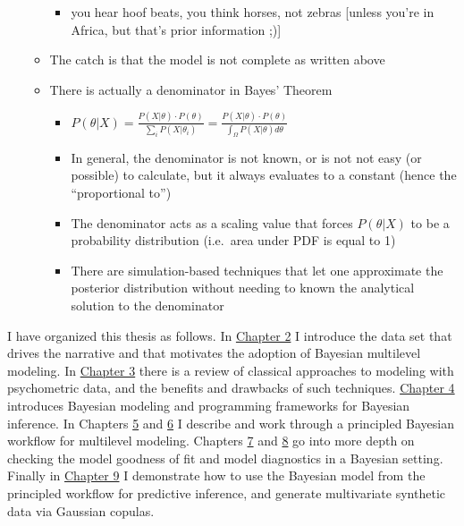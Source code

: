\documentclass[
]{article}
\providecommand{\tightlist}{%
  \setlength{\itemsep}{0pt}\setlength{\parskip}{0pt}}
\begin{document}
\begin{itemize}
\begin{itemize}
    \begin{itemize}
    \tightlist
    \item
      you hear hoof beats, you think horses, not zebras {[}unless you're in Africa, but that's prior information ;){]}
    \end{itemize}
  \item
    The catch is that the model is not complete as written above
  \item
    There is actually a denominator in Bayes' Theorem

    \begin{itemize}
    \tightlist
    \item
      \(P(\theta | X) = \frac{P(X | \theta)\cdot P(\theta)}{\sum_i P(X | \theta_i)} = \frac{P(X | \theta)\cdot P(\theta)}{\int_\Omega P(X | \theta)d\theta}\)
    \item
      In general, the denominator is not known, or is not not easy (or possible) to calculate, but it always evaluates to a constant (hence the ``proportional to'')
    \item
      The denominator acts as a scaling value that forces \(P(\theta|X)\) to be a probability distribution (i.e.~area under PDF is equal to 1)
    \item
      There are simulation-based techniques that let one approximate the posterior distribution without needing to known the analytical solution to the denominator
    \end{itemize}
  \end{itemize}
\end{itemize}

I have organized this thesis as follows. In \protect\hyperlink{ch2}{Chapter 2} I introduce the data set that drives the narrative and that motivates the adoption of Bayesian multilevel modeling. In \protect\hyperlink{ch3}{Chapter 3} there is a review of classical approaches to modeling with psychometric data, and the benefits and drawbacks of such techniques. \protect\hyperlink{ch4}{Chapter 4} introduces Bayesian modeling and programming frameworks for Bayesian inference. In Chapters \protect\hyperlink{ch5}{5} and \protect\hyperlink{ch6}{6} I describe and work through a principled Bayesian workflow for multilevel modeling. Chapters \protect\hyperlink{ch7}{7} and \protect\hyperlink{ch8}{8} go into more depth on checking the model goodness of fit and model diagnostics in a Bayesian setting. Finally in \protect\hyperlink{ch9}{Chapter 9} I demonstrate how to use the Bayesian model from the principled workflow for predictive inference, and generate multivariate synthetic data via Gaussian copulas.
\end{document}
